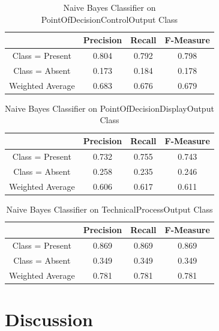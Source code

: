 \documentclass[11pt, notitlepage,abstracton,oneside]{article}   	%
\begin{document}
\begin{table}[htdp]
\caption{Naive Bayes Classifier on PointOfDecisionControlOutput Class}
\begin{center}
\begin{tabular}{|c|c|c|c|}
\hline
& Precision & Recall & F-Measure \\ \hline
Class = Present & 0.804 & 0.792 & 0.798 \\ \hline
Class = Absent & 0.173 & 0.184 & 0.178 \\ \hline
Weighted Average & 0.683 & 0.676 & 0.679 \\ \hline
\end{tabular}
\end{center}
\label{default}
\end{table}%

\begin{table}[htdp]
\caption{Naive Bayes Classifier on PointOfDecisionDisplayOutput Class}
\begin{center}
\begin{tabular}{|c|c|c|c|}
\hline
& Precision & Recall & F-Measure \\ \hline
Class = Present & 0.732 & 0.755 & 0.743 \\ \hline
Class = Absent & 0.258 & 0.235 & 0.246 \\ \hline
Weighted Average & 0.606 & 0.617 & 0.611 \\ \hline
\end{tabular}
\end{center}
\label{default}
\end{table}%

\begin{table}[htdp]
\caption{Naive Bayes Classifier on TechnicalProcessOutput Class}
\begin{center}
\begin{tabular}{|c|c|c|c|}
\hline
& Precision & Recall & F-Measure \\ \hline
Class = Present & 0.869 & 0.869 & 0.869 \\ \hline
Class = Absent & 0.349 & 0.349 & 0.349 \\ \hline
Weighted Average & 0.781 & 0.781 & 0.781 \\ \hline
\end{tabular}
\end{center}
\label{default}
\end{table}%

\section{Discussion}
\end{document}
